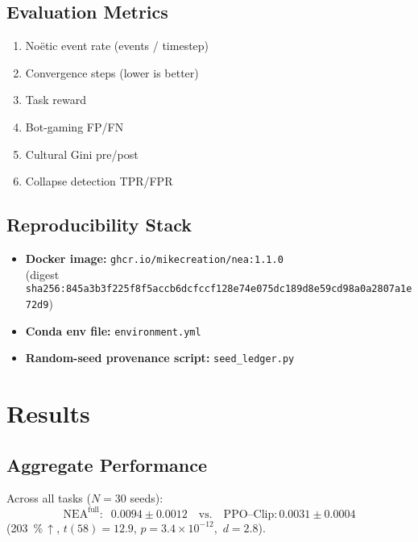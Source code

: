 \documentclass[11pt]{article}
\begin{document}
\subsection{Evaluation Metrics}
\begin{enumerate}[label=\textbf{M\arabic*},itemsep=2pt]
  \item No\"etic event rate (events / timestep)
  \item Convergence steps (lower is better)
  \item Task reward
  \item Bot-gaming FP/FN
  \item Cultural Gini pre/post
  \item Collapse detection TPR/FPR
\end{enumerate}

\subsection{Reproducibility Stack}
\begin{itemize}[itemsep=1pt]
  \item \textbf{Docker image:}
        \texttt{ghcr.io/mikecreation/nea:1.1.0}\\
        (digest \texttt{sha256:845a3b3f225f8f5accb6dcfccf128e74e075dc189d8e59cd98a0a2807a1e72d9})
  \item \textbf{Conda env file:} \texttt{environment.yml}
  \item \textbf{Random-seed provenance script:} \texttt{seed\_ledger.py}
\end{itemize}

\section{Results}
\label{sec:results}

\subsection{Aggregate Performance}
Across all tasks ($N{=}30$ seeds):
\[
  \text{NEA}^{\text{full}}:
    \;\;0.0094\pm0.0012
  \quad\text{vs.}\quad
  \text{PPO--Clip}:
    0.0031\pm0.0004
\]
(\SI{203}{\percent}\,$\uparrow$, $t(58)=12.9$, $p=3.4{\times}10^{-12}$,
$\,d{=}2.8$).
\end{document}
